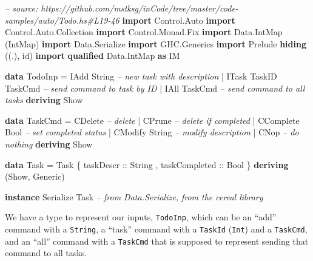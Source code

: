 \documentclass[]{article}
\newenvironment{Shaded}{\begin{snugshade}}{\end{snugshade}}
\newcommand{\CommentTok}[1]{\textcolor[rgb]{0.56,0.35,0.01}{\textit{#1}}}
\newcommand{\DataTypeTok}[1]{\textcolor[rgb]{0.13,0.29,0.53}{#1}}
\newcommand{\FunctionTok}[1]{\textcolor[rgb]{0.00,0.00,0.00}{#1}}
\newcommand{\KeywordTok}[1]{\textcolor[rgb]{0.13,0.29,0.53}{\textbf{#1}}}
\newcommand{\NormalTok}[1]{#1}
\newcommand{\OtherTok}[1]{\textcolor[rgb]{0.56,0.35,0.01}{#1}}
\begin{document}
\begin{Shaded}
\begin{Highlighting}[]
\CommentTok{-- source: https://github.com/mstksg/inCode/tree/master/code-samples/auto/Todo.hs#L19-46}
\KeywordTok{import} \DataTypeTok{Control.Auto}
\KeywordTok{import} \DataTypeTok{Control.Auto.Collection}
\KeywordTok{import} \DataTypeTok{Control.Monad.Fix}
\KeywordTok{import} \DataTypeTok{Data.IntMap}\NormalTok{             (}\DataTypeTok{IntMap}\NormalTok{)}
\KeywordTok{import} \DataTypeTok{Data.Serialize}
\KeywordTok{import} \DataTypeTok{GHC.Generics}
\KeywordTok{import} \DataTypeTok{Prelude} \KeywordTok{hiding}\NormalTok{          ((.), id)}
\KeywordTok{import} \KeywordTok{qualified} \DataTypeTok{Data.IntMap}   \KeywordTok{as} \DataTypeTok{IM}

\KeywordTok{data} \DataTypeTok{TodoInp} \FunctionTok{=} \DataTypeTok{IAdd}  \DataTypeTok{String}           \CommentTok{-- new task with description}
             \FunctionTok{|} \DataTypeTok{ITask} \DataTypeTok{TaskID} \DataTypeTok{TaskCmd}   \CommentTok{-- send command to task by ID}
             \FunctionTok{|} \DataTypeTok{IAll} \DataTypeTok{TaskCmd}           \CommentTok{-- send command to all tasks}
             \KeywordTok{deriving} \DataTypeTok{Show}

\KeywordTok{data} \DataTypeTok{TaskCmd} \FunctionTok{=} \DataTypeTok{CDelete}          \CommentTok{-- delete}
             \FunctionTok{|} \DataTypeTok{CPrune}           \CommentTok{-- delete if completed}
             \FunctionTok{|} \DataTypeTok{CComplete} \DataTypeTok{Bool}   \CommentTok{-- set completed status}
             \FunctionTok{|} \DataTypeTok{CModify} \DataTypeTok{String}   \CommentTok{-- modify description}
             \FunctionTok{|} \DataTypeTok{CNop}             \CommentTok{-- do nothing}
             \KeywordTok{deriving} \DataTypeTok{Show}

\KeywordTok{data} \DataTypeTok{Task} \FunctionTok{=} \DataTypeTok{Task}\NormalTok{ \{}\OtherTok{ taskDescr     ::} \DataTypeTok{String}
\NormalTok{                 ,}\OtherTok{ taskCompleted ::} \DataTypeTok{Bool}
\NormalTok{                 \} }\KeywordTok{deriving}\NormalTok{ (}\DataTypeTok{Show}\NormalTok{, }\DataTypeTok{Generic}\NormalTok{)}

\KeywordTok{instance} \DataTypeTok{Serialize} \DataTypeTok{Task} \CommentTok{-- from Data.Serialize, from the cereal library}
\end{Highlighting}
\end{Shaded}

We have a type to represent our inputs, \texttt{TodoInp}, which can be an
``add'' command with a \texttt{String}, a ``task'' command with a
\texttt{TaskId} (\texttt{Int}) and a \texttt{TaskCmd}, and an ``all'' command
with a \texttt{TaskCmd} that is supposed to represent sending that command to
all tasks.
\end{document}
